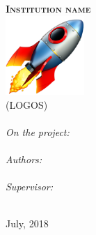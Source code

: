 \begin{titlepage}
  \begin{center}

    \textsc{\huge \bfseries Institution name\\[0.5cm]\includegraphics[width=3cm]{imgs/rocket}\\[0.5cm]}
    \textsc{\LARGE (LOGOS)}\\[1.5cm]

    \HRule\\[0.7cm]
      \emph{On the project:}\\[0.1cm]
      \noindent{}\\[1cm]

      \emph{Authors:}\\[0.1cm]
      \noindent{}\\[1cm]

      \emph{Supervisor:}
      \noindent{}\\[0.7cm]
    \HRule\\[1.5cm]

    \vfill

    {\large %
      July, 2018
    }

  \end{center}
\end{titlepage}
